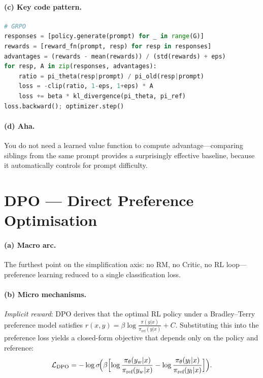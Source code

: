 \paragraph{(c) Key code pattern.}

\begin{lstlisting}[language=Python]
# GRPO
responses = [policy.generate(prompt) for _ in range(G)]
rewards = [reward_fn(prompt, resp) for resp in responses]
advantages = (rewards - mean(rewards)) / (std(rewards) + eps)
for resp, A in zip(responses, advantages):
    ratio = pi_theta(resp|prompt) / pi_old(resp|prompt)
    loss = -clip(ratio, 1-eps, 1+eps) * A
    loss += beta * kl_divergence(pi_theta, pi_ref)
loss.backward(); optimizer.step()
\end{lstlisting}

\paragraph{(d) Aha.}
You do not need a learned value function to compute advantage---comparing siblings from the same prompt provides a surprisingly effective baseline, because it automatically controls for prompt difficulty.

\section{DPO --- Direct Preference Optimisation}
\label{sec:dpo}

\paragraph{(a) Macro arc.}
The furthest point on the simplification axis: no RM, no Critic, no RL loop---preference learning reduced to a single classification loss.

\paragraph{(b) Micro mechanisms.}
\emph{Implicit reward}: DPO derives that the optimal RL policy under a Bradley--Terry preference model satisfies
$r(x,y) = \beta\log\frac{\pi(y|x)}{\pi_{\text{ref}}(y|x)} + C$.
Substituting this into the preference loss yields a closed-form objective that depends only on the policy and reference:
\[
  \mathcal{L}_{\text{DPO}} = -\log\sigma\!\Bigl(\beta\Bigl[
    \log\frac{\pi_\theta(y_w|x)}{\pi_{\text{ref}}(y_w|x)}
    - \log\frac{\pi_\theta(y_l|x)}{\pi_{\text{ref}}(y_l|x)}
  \Bigr]\Bigr).
\]

